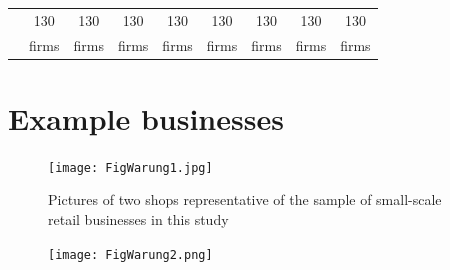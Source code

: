 \documentclass[11.5pt]{article}
\begin{document}
\begin{appendices}
\begin{table}[h!]
\begin{tabular}{|c|c|c|c|c|c|c|c|c|}
	\multicolumn{1}{|c}{} & \multicolumn{1}{|c}{130} & \multicolumn{1}{|c}{130} & \multicolumn{1}{|c}{130} & \multicolumn{1}{|c}{130} & \multicolumn{1}{|c}{130} & \multicolumn{1}{|c}{130} & \multicolumn{1}{|c}{130} & \multicolumn{1}{|c|}{130}\\
	\multicolumn{1}{|c}{} & \multicolumn{1}{|c}{firms} & \multicolumn{1}{|c}{firms} & \multicolumn{1}{|c}{firms} & \multicolumn{1}{|c}{firms} & \multicolumn{1}{|c}{firms} & \multicolumn{1}{|c}{firms} & \multicolumn{1}{|c}{firms} & \multicolumn{1}{|c|}{firms}\\
	\hline
  \end{tabular}
\end{table}



\pagebreak




\section{Example businesses}\label{sec:expbusinesses}

\begin{figure}[h!]
\centering
\caption{Pictures of two shops representative of the sample of small-scale retail businesses in this study}
\label{warung1}
    \texttt{[image: FigWarung1.jpg]}
\end{figure}

\begin{figure}[h!]
\centering
\label{warung2}
    \texttt{[image: FigWarung2.png]}
\end{figure}

\end{appendices}
\end{document}
